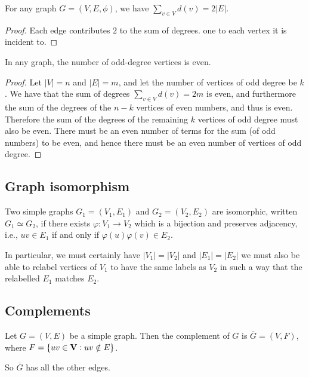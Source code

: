 \documentclass[10pt, a4paper]{article}
\begin{document}
\begin{lemma}
    For any graph $G = (V, E, \phi)$,
    we have $\sum_{v \in V}d(v) = 2|E|$.

    \begin{proof}
        Each edge contributes $2$ to the sum of degrees.
        one to each vertex it is incident to.
    \end{proof}
\end{lemma}

\begin{corollary}
    In any graph,
    the number of odd-degree vertices is even.

    \begin{proof}
        Let $|V| = n$ and $|E| = m$,
        and let the number of vertices of odd degree be $k$.
        We have that the sum of degrees $\sum_{v \in V}d(v) = 2m$ is even,
        and furthermore the sum of the degrees of the $n - k$ vertices of even numbers,
        and thus is even.
        Therefore the sum of the degrees of the remaining $k$ vertices of odd degree must also be even.
        There must be an even number of terms for the sum
        (of odd numbers)
        to be even,
        and hence there must be an even number of vertices of odd degree.
    \end{proof}
\end{corollary}

\subsection{Graph isomorphism}

\begin{definition}
    Two simple graphs $G_1 = (V_1, E_1)$ and $G_2 = (V_2, E_2)$ are isomorphic,
    written $G_1 \simeq G_2$,
    if there exists $\varphi : V_1 \rightarrow V_2$ which is a bijection and preserves adjacency,
    i.e.,
    $uv \in E_1$ if and only if $\varphi(u)\varphi(v) \in E_2$.
\end{definition}

In particular,
we must certainly have $|V_1| = |V_2|$ and $|E_1| = |E_2|$ we must also be able to relabel vertices of $V_1$ to have the same labels as $V_2$ in such a way that the relabelled $E_1$ matches $E_2$.

\subsection{Complements}

\begin{definition}
    Let $G = (V, E)$ be a simple graph.
    Then the complement of $G$ is $\overline{G} = (V, F)$,
    where $F = \{uv \in \mathbf{V} : uv \notin E\}$.

    So $\overline{G}$ has all the other edges.
\end{definition}
\end{document}
